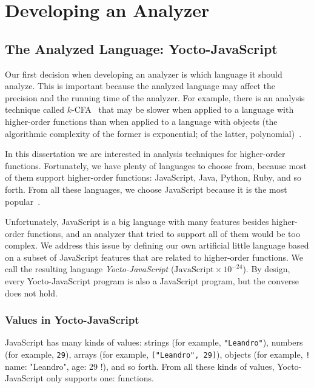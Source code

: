 \documentclass[12pt, oneside]{book}
\begin{document}
\chapter{Developing an Analyzer}


\section{The Analyzed Language: Yocto-JavaScript}
\label{The Analyzed Language: Yocto-JavaScript}

Our first decision when developing an analyzer is which language it should analyze. This is important because the analyzed language may affect the precision and the running time of the analyzer. For example, there is an analysis technique called $k$-CFA~\cite{k-cfa} that may be slower when applied to a language with higher-order functions than when applied to a language with objects (the algorithmic complexity of the former is exponential; of the latter, polynomial)~\cite{m-cfa}.

In this dissertation we are interested in analysis techniques for higher-order functions. Fortunately, we have plenty of languages to choose from, because most of them support higher-order functions: JavaScript, Java, Python, Ruby, and so forth. From all these languages, we choose JavaScript because it is the most popular~\cite{stack-overflow-developer-survey, jet-brains-developer-survey}.

Unfortunately, JavaScript is a big language with many features besides higher-order functions, and an analyzer that tried to support all of them would be too complex. We address this issue by defining our own artificial little language based on a subset of JavaScript features that are related to higher-order functions. We call the resulting language \emph{Yocto-JavaScript} ($\mathrm{JavaScript} \times 10^{-24}$). By design, every Yocto-JavaScript program is also a JavaScript program, but the converse does not hold.

\subsection{Values in Yocto-JavaScript}
\label{Values in Yocto-JavaScript}

JavaScript has many kinds of values: strings (for example, \texttt{"Leandro"}), numbers (for example, \texttt{29}), arrays (for example, \texttt{["Leandro", 29]}), objects (for example, \texttt!{ name: "Leandro", age: 29 }!), and so forth. From all these kinds of values, Yocto-JavaScript only supports one: functions.
\end{document}
